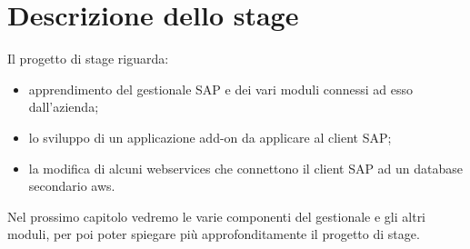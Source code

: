 \section{Descrizione dello stage}
Il progetto di stage riguarda:
\begin{itemize}
	\item apprendimento del gestionale SAP e dei vari moduli connessi ad esso dall'azienda;
	\item lo sviluppo di un applicazione add-on da applicare al client SAP;
	\item la modifica di alcuni webservices che connettono il client SAP ad un database secondario \gls{aws}.
\end{itemize}
Nel prossimo capitolo vedremo le varie componenti del gestionale e gli altri moduli, per poi poter spiegare più approfonditamente il progetto di stage.